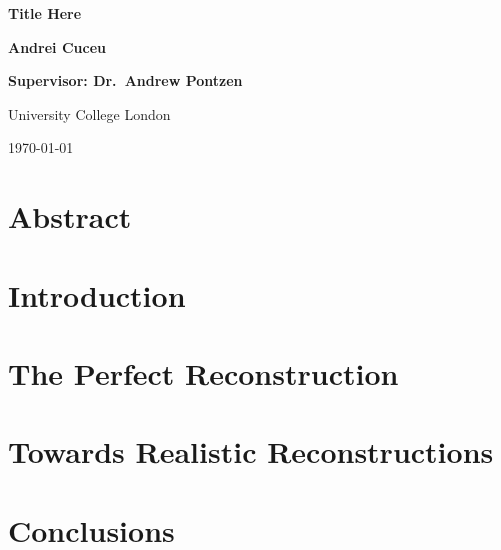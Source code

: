 \documentclass[12pt,aas_macros,twoside]{report}
\begin{document}
\begin{titlepage}
    \begin{center}
        
        \vspace*{5cm}
        {\fontsize{50}{60}\selectfont \textbf{Title Here}}
        
        
        \vspace{3cm}
        
        \Huge
        \textbf{Andrei Cuceu}
        
        
        \vspace{1cm}
        
        \huge
        \textbf{Supervisor: Dr.\ Andrew Pontzen}
        
        \vspace{7cm}
        
        \huge
        University College London
        
        \vspace{0.5cm}
        \huge
        \today
        
    \end{center}
\end{titlepage}



\chapter*{\Huge Abstract}

\cite{Eisenstein_BAOpeak_reconstruction}

\tableofcontents

\newpage
\chapter{Introduction}


% 

% 

\newpage
\chapter{The Perfect Reconstruction}


\newpage
\chapter{Towards Realistic Reconstructions}


\newpage
\chapter{Conclusions}


\printbibliography{}
\end{document}
